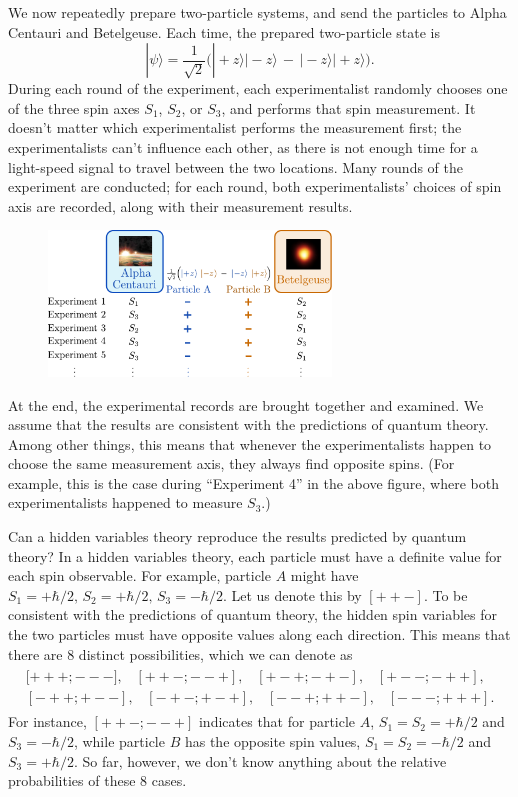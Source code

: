\documentclass[pra,12pt]{revtex4}
\begin{document}
We now repeatedly prepare two-particle systems, and send the particles
to Alpha Centauri and Betelgeuse.  Each time, the prepared
two-particle state is
\begin{equation}
  |\psi\rangle = \frac{1}{\sqrt{2}} \Big(|\!+\!z\rangle|\!-\!z\rangle \,-\, |\!-\!z\rangle|\!+\!z\rangle\Big).
\end{equation}
During each round of the experiment, each experimentalist randomly
chooses one of the three spin axes $S_1$, $S_2$, or $S_3$, and
performs that spin measurement.  It doesn't matter which
experimentalist performs the measurement first; the experimentalists
can't influence each other, as there is not enough time for a
light-speed signal to travel between the two locations.  Many rounds
of the experiment are conducted; for each round, both
experimentalists' choices of spin axis are recorded, along with their
measurement results.

\begin{figure}[h]
  \centering\includegraphics[width=0.67\textwidth]{bell}
\end{figure}

At the end, the experimental records are brought together and
examined.  We assume that the results are consistent with the
predictions of quantum theory.  Among other things, this means that
whenever the experimentalists happen to choose the same measurement
axis, they always find opposite spins.  (For example, this is the case
during ``Experiment 4'' in the above figure, where both
experimentalists happened to measure $S_3$.)

Can a hidden variables theory reproduce the results predicted by
quantum theory?  In a hidden variables theory, each particle must have
a definite value for each spin observable.  For example, particle $A$
might have $S_1 = +\hbar/2, \, S_2 = +\hbar/2, \, S_3 = -\hbar/2$.
Let us denote this by $[++-]$.  To be consistent with the predictions
of quantum theory, the hidden spin variables for the two particles
must have opposite values along each direction.  This means that there
are $8$ distinct possibilities, which we can denote as
\begin{align*}
  \begin{aligned}{[}{+++};{---}], \;\;\; [{++-};{--+}], \;\;\; [{+-+};{-+-}], \;\;\; [{+--};{-++}],\\ [{-++};{+--}], \;\;\; [{-+-};{+-+}], \;\;\; [{--+};{++-}], \;\;\; [{---};{+++}].\end{aligned}
\end{align*}
For instance, $[{++-};{--+}]$ indicates that for particle $A$, $S_1 =
S_2 = +\hbar/2$ and $S_3 = -\hbar/2$, while particle $B$ has the
opposite spin values, $S_1 = S_2 = -\hbar/2$ and $S_3 = +\hbar/2$.
So far, however, we don't know anything about the relative
probabilities of these 8 cases.
\end{document}

